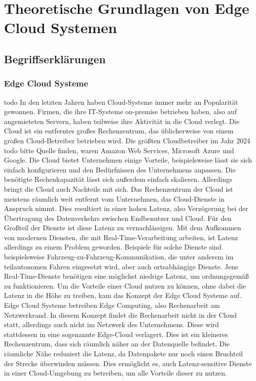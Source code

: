 \newpage
\section{Theoretische Grundlagen von Edge Cloud Systemen} \label{infos}


\subsection{Begriffserklärungen}





\subsubsection{Edge Cloud Systeme}
todo
In den letzten Jahren haben Cloud-Systeme immer mehr an Popularität gewonnen. Firmen, die ihre IT-Systeme on-premise betrieben haben, also auf angemieteten Servern, haben teilweise ihre Aktivität in die Cloud verlegt. 
Die Cloud ist ein entferntes großes Rechenzentrum, das üblicherweise von einem großen Cloud-Betreiber betrieben wird. Die größten Cloudbetreiber im Jahr 2024 todo bitte Quelle finden, waren Amazon Web Services, 
Microsoft Azure und Google. Die Cloud bietet Unternehmen einige Vorteile, beispielsweise lässt sie sich einfach konfigurieren und den Bedürfnissen des Unternehmens anpassen. 
Die benötigte Rechenkapazität lässt sich außerdem einfach skalieren. Allerdings bringt die Cloud auch Nachteile mit sich. Das Rechenzentrum der Cloud ist meistens räumlich weit entfernt vom Unternehmen, das Cloud-Dienste in Anspruch nimmt. 
Dies resultiert in einer hohen Latenz, also Verzögerung bei der Übertragung des Datenverkehrs zwischen Endbenutzer und Cloud. Für den Großteil der Dienste ist diese Latenz zu vernachlässigen. 
Mit dem Aufkommen von modernen Diensten, die mit Real-Time-Verarbeitung arbeiten, ist Latenz allerdings zu einem Problem geworden. Beispiele für solche Dienste sind beispielsweise Fahrzeug-zu-Fahrzeug-Kommunikation, 
die unter anderem im teilautonomen Fahren eingesetzt wird, aber auch ortsabhängige Dienste. Jene Real-Time-Dienste benötigen eine möglichst niedrige Latenz, um ordnungsgemäß zu funktionieren. 
Um die Vorteile einer Cloud nutzen zu können, ohne dabei die Latenz in die Höhe zu treiben, kam das Konzept der Edge Cloud Systeme auf. Edge Cloud Systeme betreiben Edge Computing, also Rechenarbeit am Netzwerkrand. 
In diesem Konzept findet die Rechenarbeit nicht in der Cloud statt, allerdings auch nicht im Netzwerk des Unternehmens. Diese wird stattdessen in eine sogenannte Edge-Cloud verlagert. 
Dies ist ein kleineres Rechenzentrum, dass sich räumlich näher an der Datenquelle befindet. Die räumliche Nähe reduziert die Latenz, da Datenpakete nur noch einen Bruchteil der Strecke überwinden müssen. 
Dies ermöglicht es, auch Latenz-sensitive Dienste in einer Cloud-Umgebung zu betreiben, um alle Vorteile dieser zu nutzen.


